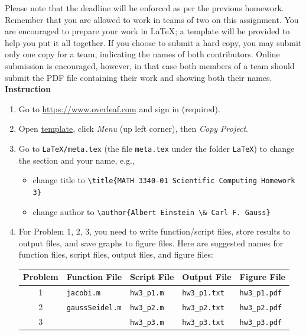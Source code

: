 %
%
%
Please note that the deadline will be enforced as per the previous homework. Remember that you are allowed to work in teams of two on this assignment. You are encouraged to prepare your work in \LaTeX{}; a template will be provided to help you put it all together. If you choose  to submit a hard copy, you may submit only one copy for a team, indicating the names of both contributors. Online submission is encouraged, however, in that case both members of a team should submit the PDF file containing  their work and showing both their names. \\[20pt]
\textbf{Instruction}
\begin{enumerate}[label={\arabic*.}]
  \item Go to \url{https://www.overleaf.com} and sign in (required).
  \item Open \href{https://www.overleaf.com/read/qczrkwtzpxft}{template}, click \emph{Menu} (up left corner), then \emph{Copy Project}.
  \item Go to \verb|LaTeX/meta.tex| (the file \verb|meta.tex| under the folder \verb|LaTeX|) to change the section and your name, e.g.,
    \begin{itemize}
      \item change title to \verb|\title{MATH 3340-01 Scientific Computing Homework 3}|
      \item change author to \verb|\author{Albert Einstein \& Carl F. Gauss}|
    \end{itemize}
  \item For Problem 1, 2, 3, you need to write function/script files, store results to output files, and save graphs to figure files. Here are suggested names for function files, script files, output files, and figure files:
    \begin{table}[!hbtp]
      \centering
      \begin{tabular}{cllll}
        \toprule
        Problem & Function File        & Script File     & Output File       & Figure File       \\
        \midrule
        1       & \verb|jacobi.m|      & \verb|hw3_p1.m| & \verb|hw3_p1.txt| & \verb|hw3_p1.pdf| \\
        2       & \verb|gaussSeidel.m| & \verb|hw3_p2.m| & \verb|hw3_p2.txt| & \verb|hw3_p2.pdf| \\
        3       &                      & \verb|hw3_p3.m| & \verb|hw3_p3.txt| & \verb|hw3_p3.pdf| \\
        \bottomrule
      \end{tabular}
    \end{table}


\end{enumerate}
